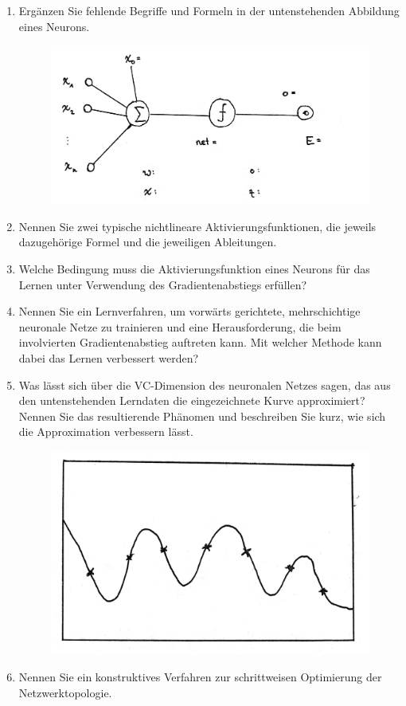 \documentclass[fleqn]{latex-classes/summary}
\begin{document}
\begin{enumerate}
  \item Ergänzen Sie fehlende Begriffe und Formeln in der untenstehenden Abbildung eines Neurons.
  \begin{figure}[H]
    \centering
    \includegraphics[width=.8\linewidth]{assets/img/neuron.png}
  \end{figure}

  \item Nennen Sie zwei typische nichtlineare Aktivierungsfunktionen, die jeweils dazugehörige Formel und die jeweiligen Ableitungen.
  \item Welche Bedingung muss die Aktivierungsfunktion eines Neurons für das Lernen unter Verwendung des Gradientenabstiegs erfüllen?
  \item Nennen Sie ein Lernverfahren, um vorwärts gerichtete, mehrschichtige neuronale Netze zu trainieren und eine Herausforderung, die beim involvierten Gradientenabstieg auftreten kann. Mit welcher Methode kann dabei das Lernen verbessert werden?
  \item Was lässt sich über die VC-Dimension des neuronalen Netzes sagen, das aus den untenstehenden Lerndaten die eingezeichnete Kurve approximiert? Nennen Sie das resultierende Phänomen und beschreiben Sie kurz, wie sich die Approximation verbessern lässt.
  \begin{figure}[H]
    \centering
    \includegraphics[width=.5\linewidth]{assets/img/vc.png}
  \end{figure}

  \item Nennen Sie ein konstruktives Verfahren zur schrittweisen Optimierung der Netzwerktopologie.
\end{enumerate}
\end{document}
